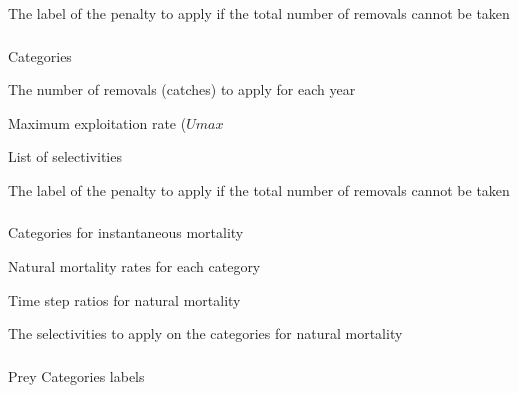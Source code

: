  {The label of the penalty to apply if the total number of removals cannot be taken}

\subsubsection[Mortality Initialisation Event Biomass]{}

 {Categories}

 {The number of removals (catches) to apply for each year}

 {Maximum exploitation rate ($Umax$}

 {List of selectivities}

 {The label of the penalty to apply if the total number of removals cannot be taken}

\subsubsection[Mortality Instantaneous]{}

 {Categories for instantaneous mortality}

 {Natural mortality rates for each category}

 {Time step ratios for natural mortality}

 {The selectivities to apply on the categories for natural mortality}

\subsubsection[Mortality Prey Suitability]{}

 {Prey Categories labels}

